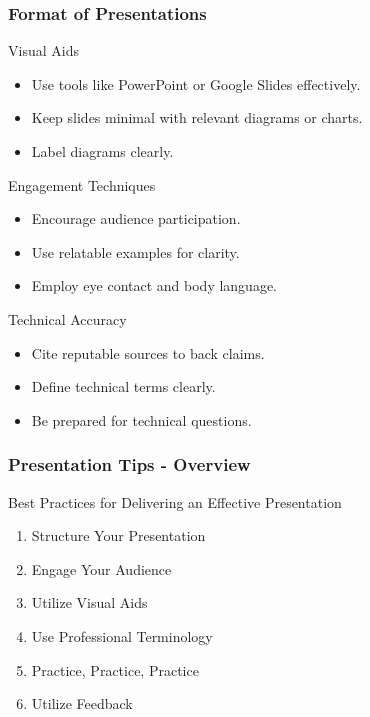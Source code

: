 \documentclass[aspectratio=169]{beamer}
\begin{document}
\begin{frame}[fragile]
    \frametitle{Format of Presentations}
    \begin{block}{Visual Aids}
        \begin{itemize}
            \item Use tools like PowerPoint or Google Slides effectively.
            \item Keep slides minimal with relevant diagrams or charts.
            \item Label diagrams clearly.
        \end{itemize}
    \end{block}
    
    \begin{block}{Engagement Techniques}
        \begin{itemize}
            \item Encourage audience participation.
            \item Use relatable examples for clarity.
            \item Employ eye contact and body language.
        \end{itemize}
    \end{block}
    
    \begin{block}{Technical Accuracy}
        \begin{itemize}
            \item Cite reputable sources to back claims.
            \item Define technical terms clearly.
            \item Be prepared for technical questions.
        \end{itemize}
    \end{block}
\end{frame}

\begin{frame}[fragile]
    \frametitle{Presentation Tips - Overview}
    \begin{block}{Best Practices for Delivering an Effective Presentation}
        \begin{enumerate}
            \item Structure Your Presentation
            \item Engage Your Audience
            \item Utilize Visual Aids
            \item Use Professional Terminology
            \item Practice, Practice, Practice
            \item Utilize Feedback
        \end{enumerate}
    \end{block}
\end{frame}
\end{document}
